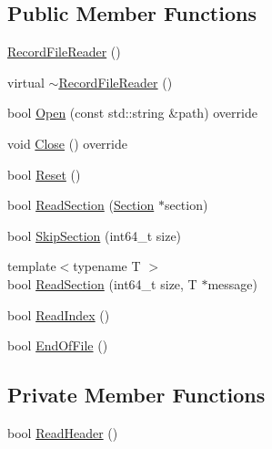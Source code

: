 \subsection*{Public Member Functions}
\begin{DoxyCompactItemize}
\item 
\hyperlink{classapollo_1_1cyber_1_1record_1_1RecordFileReader_a57734f39b197e75753231571187fc9c0}{Record\-File\-Reader} ()
\item 
virtual \hyperlink{classapollo_1_1cyber_1_1record_1_1RecordFileReader_a83310b8a8755c0c1d8b690d95ceb2a3e}{$\sim$\-Record\-File\-Reader} ()
\item 
bool \hyperlink{classapollo_1_1cyber_1_1record_1_1RecordFileReader_acfa88962cea18d7b501d89aa25e6357d}{Open} (const std\-::string \&path) override
\item 
void \hyperlink{classapollo_1_1cyber_1_1record_1_1RecordFileReader_ac4e0a584b0ee980e42418511d9743d1f}{Close} () override
\item 
bool \hyperlink{classapollo_1_1cyber_1_1record_1_1RecordFileReader_ac2406fed1da826f4eb126df7af744bb2}{Reset} ()
\item 
bool \hyperlink{classapollo_1_1cyber_1_1record_1_1RecordFileReader_a2b9b48bd3a91cbc0d61a93412fe9ab7f}{Read\-Section} (\hyperlink{structapollo_1_1cyber_1_1record_1_1Section}{Section} $\ast$section)
\item 
bool \hyperlink{classapollo_1_1cyber_1_1record_1_1RecordFileReader_a6edde4b89164eea56a9d49a2c27ecb2a}{Skip\-Section} (int64\-\_\-t size)
\item 
{\footnotesize template$<$typename T $>$ }\\bool \hyperlink{classapollo_1_1cyber_1_1record_1_1RecordFileReader_ac7259d46ca8dd6ecbcd120090c30d275}{Read\-Section} (int64\-\_\-t size, T $\ast$message)
\item 
bool \hyperlink{classapollo_1_1cyber_1_1record_1_1RecordFileReader_afcc5d6bc608eb8e16e562269c2c03d2f}{Read\-Index} ()
\item 
bool \hyperlink{classapollo_1_1cyber_1_1record_1_1RecordFileReader_a1dc27063c9808b195fec1ae541959fe3}{End\-Of\-File} ()
\end{DoxyCompactItemize}
\subsection*{Private Member Functions}
\begin{DoxyCompactItemize}
\item 
bool \hyperlink{classapollo_1_1cyber_1_1record_1_1RecordFileReader_a071a6f92393b70a37f0796727872b133}{Read\-Header} ()
\end{DoxyCompactItemize}
